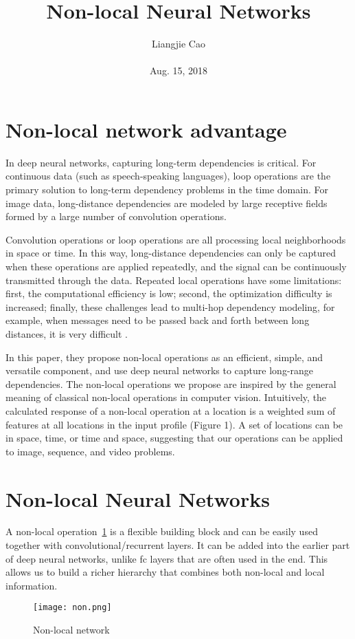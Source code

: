\documentclass[10pt,twocolumn,letterpaper]{article}
\begin{document}
\title{\textbf{Non-local Neural Networks}}
\author{Liangjie Cao\\\\ Aug. 15, 2018}
\maketitle
\section{Non-local network advantage}
In deep neural networks, capturing long-term dependencies is critical. For continuous data (such as speech-speaking languages), loop operations are the primary solution to long-term dependency problems in the time domain. For image data, long-distance dependencies are modeled by large receptive fields formed by a large number of convolution operations.

Convolution operations or loop operations are all processing local neighborhoods in space or time. In this way, long-distance dependencies can only be captured when these operations are applied repeatedly, and the signal can be continuously transmitted through the data. Repeated local operations have some limitations: first, the computational efficiency is low; second, the optimization difficulty is increased; finally, these challenges lead to multi-hop dependency modeling, for example, when messages need to be passed back and forth between long distances, it is very difficult .

In this paper, they propose non-local operations as an efficient, simple, and versatile component, and use deep neural networks to capture long-range dependencies. The non-local operations we propose are inspired by the general meaning of classical non-local operations in computer vision. Intuitively, the calculated response of a non-local operation at a location is a weighted sum of features at all locations in the input profile (Figure 1). A set of locations can be in space, time, or time and space, suggesting that our operations can be applied to image, sequence, and video problems.
\section{ Non-local Neural Networks}
A non-local operation~\ref{Figure1} is a flexible building block and can
be easily used together with convolutional/recurrent layers.
It can be added into the earlier part of deep neural networks,
unlike
fc
layers that are often used in the end. This allows us
to build a richer hierarchy that combines both non-local and
local information.
  \begin{figure}[!htb]
  	\centering
  	\texttt{[image: non.png]}\\
  	\caption{Non-local network}\label{Figure1}
  \end{figure}
\end{document}
